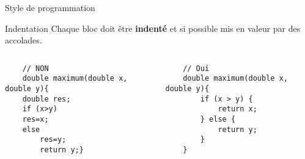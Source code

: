 \begin{frame}[fragile]{Style de programmation}
\begin{block}{Indentation}
Chaque bloc doit être \textbf{indenté} et si possible mis en valeur par des accolades.
\end{block}

\begin{columns}[T]
    \begin{column}{0.5\textwidth}
    \begin{verbatim}
    // NON
    double maximum(double x, double y){
    double res;
    if (x>y)
    res=x;
    else
        res=y;
        return y;}
    \end{verbatim}
    \end{column}
    \begin{column}{0.5\textwidth}
    \begin{verbatim}
    // Oui
    double maximum(double x, double y){
        if (x > y) {
            return x;
        } else {
            return y;
        }
    }
    \end{verbatim}
    \end{column}
\end{columns}
\end{frame}

